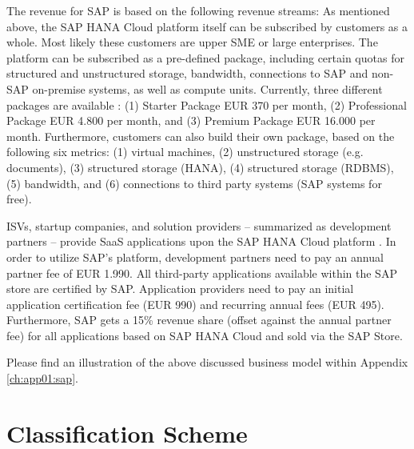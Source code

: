 The revenue for SAP is based on the following revenue streams: As mentioned above, the SAP HANA Cloud platform itself can be subscribed by customers as a whole. Most likely these customers are upper \ac{SME} or large enterprises. The platform can be subscribed as a pre-defined package, including certain quotas for structured and unstructured storage, bandwidth, connections to SAP and non-SAP on-premise systems, as well as compute units. Currently, three different packages are available \citep{SAP2013b}: (1) Starter Package EUR 370 per month, (2) Professional Package EUR 4.800 per month, and (3) Premium Package EUR 16.000 per month. Furthermore, customers can also build their own package, based on the following six metrics: (1) virtual machines, (2) unstructured storage (e.g. documents), (3) structured storage (HANA), (4) structured storage (RDBMS), (5) bandwidth, and (6) connections to third party systems (SAP systems for free). 

\acp{ISV}, startup companies, and solution providers -- summarized as development partners -- provide \ac{SaaS} applications upon the SAP HANA Cloud platform \citep{SAP2013a}. In order to utilize SAP's platform, development partners need to pay an annual partner fee of EUR 1.990. All third-party applications available within the SAP store are certified by SAP. Application providers need to pay an initial application certification fee (EUR 990) and recurring annual fees (EUR 495). Furthermore, SAP gets a 15\% revenue share (offset against the annual partner fee) for all applications based on SAP HANA Cloud and sold via the SAP Store.

Please find an illustration of the above discussed business model within Appendix \ref{ch:app01:sap}.

%

\section{Classification Scheme}\label{ch:sota:cm}

